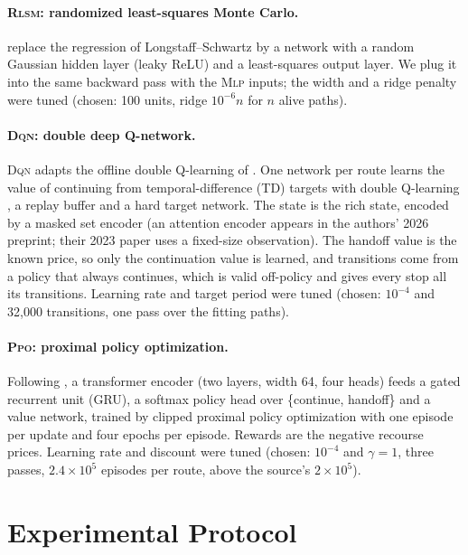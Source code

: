 \documentclass[trsc,dblanonrev]{informs4}
\newcommand{\Mlp}{\textsc{Mlp}}
\newcommand{\Rlsm}{\textsc{Rlsm}}
\newcommand{\Dqn}{\textsc{Dqn}}
\newcommand{\Ppo}{\textsc{Ppo}}
\begin{document}
\paragraph{\Rlsm{}: randomized least-squares Monte Carlo.}
\citet{herrera2024optimal} replace the regression of Longstaff--Schwartz by a
network with a random Gaussian hidden layer (leaky ReLU) and a least-squares
output layer. We plug it into the same backward pass with the \Mlp{} inputs;
the width and a ridge penalty were tuned (chosen: 100 units, ridge
$10^{-6}n$ for $n$ alive paths).

\paragraph{\Dqn{}: double deep Q-network.} \Dqn{} adapts the offline double
Q-learning of \citet{dastpak2023offline}. One network per route learns the
value of continuing from temporal-difference (TD) targets with double
Q-learning \citep{vanhasselt2016deep, mnih2015human}, a replay buffer and a
hard target network. The state is the rich state, encoded by a masked set
encoder (an attention encoder appears in the authors' 2026 preprint; their
2023 paper uses a fixed-size observation). The handoff value is the known
price, so only the continuation value is learned, and transitions come from a
policy that always continues, which is valid off-policy and gives every stop
all its transitions. Learning rate and target period were tuned (chosen:
$10^{-4}$ and 32{,}000 transitions, one pass over the fitting paths).

\paragraph{\Ppo{}: proximal policy optimization.} Following
\citet{kadyrov2025drl}, a transformer encoder (two layers, width 64, four
heads) feeds a gated recurrent unit (GRU), a softmax policy head over
\{continue, handoff\} and a value network, trained by clipped proximal policy
optimization \citep{schulman2017proximal} with one episode per update and four
epochs per episode. Rewards are the negative recourse prices. Learning rate and
discount were tuned (chosen: $10^{-4}$ and $\gamma = 1$, three passes,
$2.4 \times 10^5$ episodes per route, above the source's $2 \times 10^5$).

\section{Experimental Protocol}\label{sec:protocol}
\end{document}
